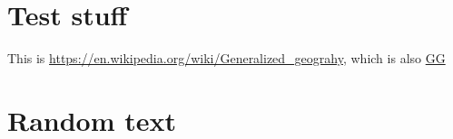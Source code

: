 \documentclass[12pt]{article}
\begin{document}
\section{Test stuff}
This is \url{https://en.wikipedia.org/wiki/Generalized_geograhy}, which
is also \href{https://en.wikipedia.org/wiki/Generalized_geograhy}{GG}

\section{Random text}
\lipsum
\end{document}
